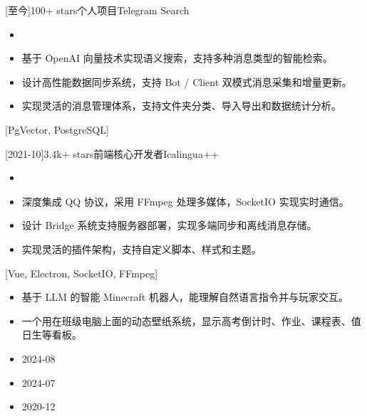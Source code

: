 \documentclass[zh]{resume}
\begin{document}
\begin{projects}
  [至今]{100+ stars}{个人项目}{Telegram Search}{
    \begin{itemize}
      \item {}
      \item 基于 OpenAI 向量技术实现语义搜索，支持多种消息类型的智能检索。
      \item 设计高性能数据同步系统，支持 Bot / Client 双模式消息采集和增量更新。
      \item 实现灵活的消息管理体系，支持文件夹分类、导入导出和数据统计分析。
    \end{itemize}
  }[PgVector, PostgreSQL]

  \separator{0.5ex}
  [2021-10]{3.4k+ stars}{前端核心开发者}{Icalingua++}{
    \begin{itemize}
      \item {}
      \item 深度集成 QQ 协议，采用 FFmpeg 处理多媒体，SocketIO 实现实时通信。
      \item 设计 Bridge 系统支持服务器部署，实现多端同步和离线消息存储。
      \item 实现灵活的插件架构，支持自定义脚本、样式和主题。
    \end{itemize}
  }[Vue, Electron, SocketIO, FFmpeg]
\end{projects}

\begin{itemize}
  \item 基于 LLM 的智能 Minecraft 机器人，能理解自然语言指令并与玩家交互。
  \item 一个用在班级电脑上面的动态壁纸系统，显示高考倒计时、作业、课程表、值日生等看板。
\end{itemize}

\begin{itemize}
  \item 2024-08
  \item 2024-07
  \item 2020-12
\end{itemize}
\end{document}
